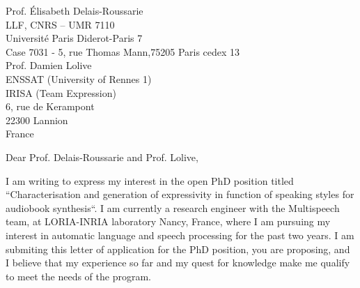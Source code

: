 \documentclass[
	backaddress=off,
	pagenumber=false, %
	parskip=half, %
	fromalign=right, %
	foldmarks=false, %
	addrfield=true %
	]{scrlttr2}
\date{\today} %
\begin{document}
 
\begin{letter}{Prof. Élisabeth Delais\--Roussarie \\ LLF, CNRS – UMR 7110\\ Université Paris Diderot-Paris 7\\
Case 7031 \-- 5, rue Thomas Mann,75205 Paris cedex 13\\ Prof. Damien Lolive\\ ENSSAT (University of Rennes 1)\\ IRISA (Team Expression) \\
6, rue de Kerampont\\
22300 Lannion\\
France\\} %



\opening{Dear Prof. Delais\--Roussarie and Prof. Lolive,}

I am writing to express my interest in the open PhD position titled ``Characterisation  and  generation  of  expressivity  in  function  of  speaking  styles  for  audiobook 
synthesis``. I am currently a research engineer with the Multispeech team, at LORIA-INRIA laboratory Nancy, France, where I am pursuing my interest in automatic language and speech processing for the past two years. I am submiting this letter of application for the PhD position, you are proposing, and I believe that my experience so far and my quest for knowledge make me qualify to meet the needs of the program. 
		

\end{letter}
\end{document}
